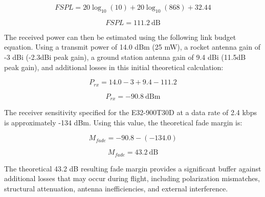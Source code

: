 \documentclass[11pt, a4paper]{article} %
\begin{document}
\begin{equation}
    FSPL = 20\log_{10}(10) + 20\log_{10}(868) + 32.44
\end{equation}

\begin{equation}
    FSPL = 111.2~\mathrm{dB}
\end{equation}

The received power can then be estimated using the following link budget equation. Using a transmit power of 14.0 dBm (25 mW), a  rocket antenna gain of -3 dBi (-2.3dBi peak gain), a ground station antenna gain of 9.4 dBi (11.5dB peak gain), and additional losses in this initial theoretical calculation:

\begin{equation}
    P_{rx} = 14.0 -3 + 9.4 - 111.2
\end{equation}

\begin{equation}
    P_{rx} = -90.8~\mathrm{dBm}
\end{equation}

The receiver sensitivity specified for the E32-900T30D at a data rate of 2.4 kbps is approximately -134 dBm. Using this value, the theoretical fade margin is:

\begin{equation}
    M_{fade} = -90.8 - (-134.0)
\end{equation}

\begin{equation}
    M_{fade} = 43.2~\mathrm{dB}
\end{equation}

The theoretical 43.2 dB resulting fade margin provides a significant buffer against additional losses that may occur during flight, including polarization mismatches, structural attenuation, antenna inefficiencies, and external interference.
\end{document}
